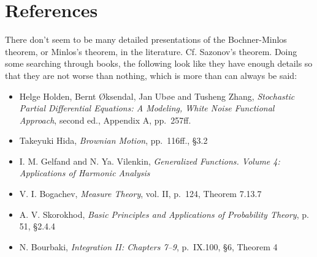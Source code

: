 \documentclass{article}
\theoremstyle{definition}
\begin{document}
\section{References}
There don't seem to be many detailed presentations of the Bochner-Minlos theorem, or Minlos's theorem, in the literature. Cf. Sazonov's theorem.
Doing some searching through books, the following look like they have enough details so that they are not  worse than nothing, which is more than can always be said:
\begin{itemize}
\item Helge Holden, Bernt {\O}ksendal, Jan Ub{\o}e and Tusheng Zhang, {\em Stochastic Partial Differential Equations: A Modeling, White Noise
Functional Approach}, second ed., Appendix A, pp.~257ff.
\item Takeyuki Hida, {\em Brownian Motion}, pp.~116ff., \S 3.2
\item I. M. Gelfand and N. Ya. Vilenkin, {\em Generalized Functions. Volume 4: Applications of Harmonic Analysis}
\item V. I. Bogachev, {\em Measure Theory}, vol. II, p.~124, Theorem 7.13.7
\item A. V. Skorokhod, {\em Basic Principles and Applications of Probability Theory}, p. 51, \S 2.4.4
\item N. Bourbaki, {\em Integration II: Chapters 7--9}, p.~IX.100, \S 6, Theorem 4
\end{itemize}
 
\end{document}
